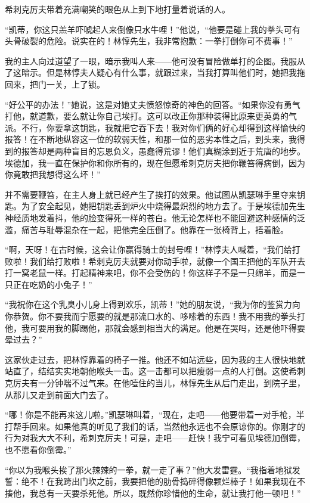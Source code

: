 \par 希刺克厉夫带着充满嘲笑的眼色从上到下地打量着说话的人。
\par “凯蒂，你这只羔羊吓唬起人来倒像只水牛哩！”他说，“他要是碰上我的拳头可有头骨破裂的危险。说实在的！林惇先生，我非常抱歉：一拳打倒你可不费事！”
\par 我的主人向过道望了一眼，暗示我叫人来——他可没有冒险做单打的企图。我服从了这暗示。但是林惇夫人疑心有什么事，就跟过来，当我打算叫他们时，她把我拖回来，把门一关，上了锁。
\par “好公平的办法！”她说，这是对她丈夫愤怒惊奇的神色的回答。“如果你没有勇气打他，就道歉，要么就让你自己埃打。这可以改正你那种装得比原来更英勇的气派。不行，你要拿这钥匙，我就把它吞下去！我对你们俩的好心却得到这样愉快的报答！在不断地纵容这一位的软弱天性，和那一位的恶劣本性之后，到头来，我得到的报答却是两种盲目的忘恩负义，愚蠢得荒谬！他们真糊涂到近于荒唐的地步。埃德加，我一直在保护你和你所有的，现在但愿希刺克厉夫把你鞭笞得病倒，因为你竟敢把我想得这么坏！”
\par 并不需要鞭笞，在主人身上就已经产生了挨打的效果。他试图从凯瑟琳手里夺来钥匙。为了安全起见，她把钥匙丢到炉火中烧得最炽烈的地方去了。于是埃德加先生神经质地发着抖，他的脸变得死一样的苍白。他无论怎样也不能回避这种感情的泛滥，痛苦与耻辱混杂在一起，把他完全压倒了。他靠在一张椅背上，捂着脸。
\par “啊，天呀！在古时候，这会让你赢得骑士的封号哩！”林惇夫人喊着，“我们给打败啦！我们给打败啦！希刺克厉夫就要对你动手啦，就像一个国王把他的军队开去打一窝老鼠一样。打起精神来吧，你不会受伤的！你这样子不是一只绵羊，而是一只正在吃奶的小兔子！”
\par “我祝你在这个乳臭小儿身上得到欢乐，凯蒂！”她的朋友说，“我为你的鉴赏力向你恭贺。你不要我而宁愿要的就是那流口水的、哆嗦着的东西！我不用我的拳头打他，我可要用我的脚踢他，那就会感到相当大的满足。他是在哭吗，还是他吓得要晕过去？”
\par 这家伙走过去，把林惇靠着的椅子一推。他还不如站远些，因为我的主人很快地就站直了，结结实实地朝他喉头一击。这一击都可以把瘦弱一点的人打倒。这使希刺克厉夫有一分钟喘不过气来。在他噎住的当儿，林惇先生从后门走出，到院子里，从那儿又走到前面大门去了。
\par “哪！你是不能再来这儿啦。”凯瑟琳叫着，“现在，走吧——他要带着一对手枪，半打帮手回来。如果他真的听见了我们的话，当然他永远也不会原谅你的。你刚才的行为对我大大不利，希刺克厉夫！可是，走吧——赶快！我宁可看见埃德加倒霉，也不愿看你倒霉。”
\par “你以为我喉头挨了那火辣辣的一拳，就一走了事？”他大发雷霆。“我指着地狱发誓：绝不！在我跨出门坎之前，我要把他的肋骨捣碎得像颗烂棒子！如果我现在不揍他，我总有一天要杀死他。所以，既然你珍惜他的生命，就让我打他一顿吧！”
